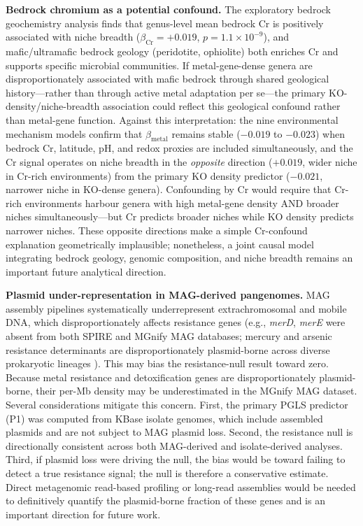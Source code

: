 \documentclass[times]{zHenriquesLab-StyleBioRxiv}
\begin{document}
\textbf{Bedrock chromium as a potential confound.} The exploratory bedrock
geochemistry analysis finds that genus-level mean bedrock Cr is positively
associated with niche breadth ($\beta_\mathrm{Cr} = +0.019$,
$p = 1.1 \times 10^{-9}$), and mafic/ultramafic bedrock geology (peridotite,
ophiolite) both enriches Cr and supports specific microbial communities. If
metal-gene-dense genera are disproportionately associated with mafic bedrock
through shared geological history---rather than through active metal adaptation
per se---the primary KO-density/niche-breadth association could reflect this
geological confound rather than metal-gene function. Against this
interpretation: the nine environmental mechanism models confirm that
$\beta_\mathrm{metal}$ remains stable ($-0.019$ to $-0.023$) when bedrock Cr,
latitude, pH, and redox proxies are included simultaneously, and the Cr signal
operates on niche breadth in the \emph{opposite} direction ($+0.019$, wider
niche in Cr-rich environments) from the primary KO density predictor ($-0.021$,
narrower niche in KO-dense genera). Confounding by Cr would require that
Cr-rich environments harbour genera with high metal-gene density AND broader
niches simultaneously---but Cr predicts broader niches while KO density predicts
narrower niches. These opposite directions make a simple Cr-confound explanation
geometrically implausible; nonetheless, a joint causal model integrating bedrock
geology, genomic composition, and niche breadth remains an important future
analytical direction.

\textbf{Plasmid under-representation in MAG-derived pangenomes.} MAG assembly
pipelines systematically underrepresent extrachromosomal and mobile DNA, which
disproportionately affects resistance genes (e.g., \textit{merD}, \textit{merE}
were absent from both SPIRE and MGnify MAG databases; mercury and arsenic
resistance determinants are disproportionately plasmid-borne across diverse
prokaryotic lineages \cite{silver2005,christakis2021}). This may bias the
resistance-null result toward zero. Because metal resistance and detoxification
genes are disproportionately plasmid-borne, their per-Mb density may be
underestimated in the MGnify MAG dataset. Several considerations mitigate this
concern. First, the primary PGLS predictor (P1) was computed from KBase isolate
genomes, which include assembled plasmids and are not subject to MAG plasmid
loss. Second, the resistance null is directionally consistent across both
MAG-derived and isolate-derived analyses. Third, if plasmid loss were driving
the null, the bias would be toward failing to detect a true resistance signal;
the null is therefore a conservative estimate. Direct metagenomic read-based
profiling or long-read assemblies would be needed to definitively quantify the
plasmid-borne fraction of these genes and is an important direction for future
work.
\end{document}
